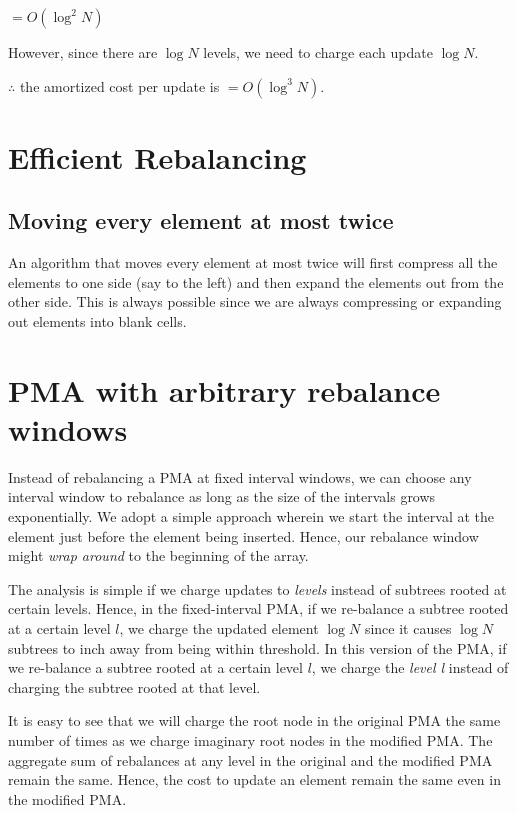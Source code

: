 \documentclass{article}
\begin{document}
$= O(\log^2{N})$

However, since there are $\log{N}$ levels, we need to charge each update $\log{N}$.

$\therefore$ the amortized cost per update is $= O(\log^3{N})$.

\clearpage

\section{Efficient Rebalancing}

\subsection{Moving every element at most twice}

An algorithm that moves every element at most twice will first
compress all the elements to one side (say to the left) and then
expand the elements out from the other side. This is always possible
since we are always compressing or expanding out elements into blank
cells.

\clearpage

\section{PMA with arbitrary rebalance windows}

Instead of rebalancing a PMA at fixed interval windows, we can choose
any interval window to rebalance as long as the size of the intervals
grows exponentially. We adopt a simple approach wherein we start the
interval at the element just before the element being inserted. Hence,
our rebalance window might \textit{wrap around} to the beginning of
the array.

The analysis is simple if we charge updates to \textit{levels} instead
of subtrees rooted at certain levels. Hence, in the fixed-interval
PMA, if we re-balance a subtree rooted at a certain level $l$, we
charge the updated element $\log{N}$ since it causes $\log{N}$
subtrees to inch away from being within threshold. In this version of
the PMA, if we re-balance a subtree rooted at a certain level $l$, we
charge the \textit{level l} instead of charging the subtree rooted at
that level.

It is easy to see that we will charge the root node in the original
PMA the same number of times as we charge imaginary root nodes in the
modified PMA. The aggregate sum of rebalances at any level in the
original and the modified PMA remain the same. Hence, the cost to
update an element remain the same even in the modified PMA.
\end{document}
